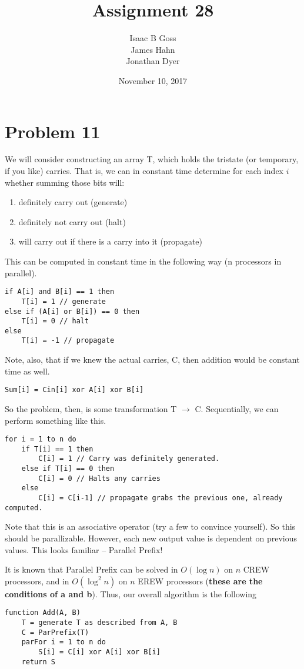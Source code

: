 \documentclass{article}
\author{Isaac B Goss\\ James Hahn\\ Jonathan Dyer}
\date{November 10, 2017}
\title{Assignment 28}
\providecommand{\prob}[1]{\section*{Problem #1}}
\providecommand{\tightlist}{
    \setlength{\itemsep}{0pt}\setlength{\parskip}{0pt}
}
\begin{document}
\maketitle
    \prob{11}
    We will consider constructing an array T, which holds the tristate (or temporary, if you like) carries.
    That is, we can in constant time determine for each index $i$ whether summing those bits will:
    \begin{enumerate}\tightlist
        \item definitely carry out (generate)
        \item definitely not carry out (halt)
        \item will carry out if there is a carry into it (propagate)
    \end{enumerate}
    This can be computed in constant time in the following way (n processors in parallel).
    \begin{lstlisting}
if A[i] and B[i] == 1 then
    T[i] = 1 // generate
else if (A[i] or B[i]) == 0 then
    T[i] = 0 // halt
else
    T[i] = -1 // propagate
    \end{lstlisting}
    Note, also, that if we knew the actual carries, C, then addition would be constant time as well.
    \begin{lstlisting}
Sum[i] = Cin[i] xor A[i] xor B[i]
    \end{lstlisting}

    So the problem, then, is some transformation T $\to$ C.
    Sequentially, we can perform something like this.
    \begin{lstlisting}
for i = 1 to n do
    if T[i] == 1 then
        C[i] = 1 // Carry was definitely generated.
    else if T[i] == 0 then
        C[i] = 0 // Halts any carries
    else
        C[i] = C[i-1] // propagate grabs the previous one, already computed.
    \end{lstlisting}
    Note that this is an associative operator (try a few to convince yourself).
    So this should be parallizable.
    However, each new output value is dependent on previous values.
    This looks familiar -- Parallel Prefix!

    It is known that Parallel Prefix can be solved in $O(\log n)$ on $n$ CREW processors, and in $O(\log^2 n)$ on $n$ EREW processors (\textbf{these are the conditions of a and b}).
    Thus, our overall algorithm is the following

\begin{lstlisting}
function Add(A, B)
    T = generate T as described from A, B
    C = ParPrefix(T)
    parFor i = 1 to n do
        S[i] = C[i] xor A[i] xor B[i]
    return S
\end{lstlisting}
\end{document}
